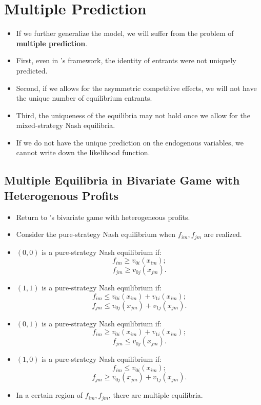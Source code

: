\documentclass[]{book}
\providecommand{\tightlist}{%
  \setlength{\itemsep}{0pt}\setlength{\parskip}{0pt}}
\begin{document}
\section{Multiple Prediction}\label{multiple-prediction}

\begin{itemize}
\tightlist
\item
  If we further generalize the model, we will suffer from the problem of
  \textbf{multiple prediction}.
\item
  First, even in \citet{berryEstimationModelEntry1992}'s framework, the
  identity of entrants were not uniquely predicted.
\item
  Second, if we allows for the asymmetric competitive effects, we will
  not have the unique number of equilibrium entrants.
\item
  Third, the uniqueness of the equilibria may not hold once we allow for
  the mixed-strategy Nash equilibria.
\item
  If we do not have the unique prediction on the endogenous variables,
  we cannot write down the likelihood function.
\end{itemize}

\subsection{Multiple Equilibria in Bivariate Game with Heterogenous
Profits}\label{multiple-equilibria-in-bivariate-game-with-heterogenous-profits}

\begin{itemize}
\tightlist
\item
  Return to \citet{tamerIncompleteSimultaneousDiscrete2003}'s bivariate
  game with heterogeneous profits.
\item
  Consider the pure-strategy Nash equilibrium when \(f_{im}, f_{jm}\)
  are realized.
\item
  \((0, 0)\) is a pure-strategy Nash equilibrium if: \[
  f_{im} \ge v_{0i}(x_{im});
  \] \[
  f_{jm} \ge v_{0j}(x_{jm}).
  \]
\item
  \((1, 1)\) is a pure-strategy Nash equilibrium if: \[
  f_{im} \le v_{0i}(x_{im}) + v_{1i}(x_{im});
  \] \[
  f_{jm} \le v_{0j}(x_{jm}) + v_{1j}(x_{jm}).
  \]
\item
  \((0, 1)\) is a pure-strategy Nash equilibrium if: \[
  f_{im} \ge v_{0i}(x_{im}) + v_{1i}(x_{im});
  \] \[
  f_{jm} \le v_{0j}(x_{jm}).
  \]
\item
  \((1, 0)\) is a pure-strategy Nash equilibrium if: \[
  f_{im} \le v_{0i}(x_{im});
  \] \[
  f_{jm} \ge v_{0j}(x_{jm}) + v_{1j}(x_{jm}).
  \]
\item
  In a certain region of \(f_{im}, f_{jm}\), there are multiple
  equilibria.
\end{itemize}
\end{document}
